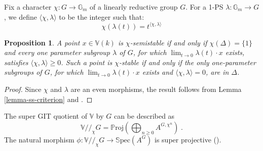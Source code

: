 \documentclass[12pt, reqno]{amsart}
\theoremstyle{plain}
\newtheorem{proposition}[theorem]{Proposition}
\numberwithin{equation}{section}
\def \ra{\rightarrow}
\newcommand{\Spec}[1]{\mathbb{S}\mathrm{pec}(#1)}
\newcommand{\Proj}[1]{\mathbb{P}\mathrm{roj}(#1)}
\begin{document}
Fix a character $ \chi: G \to \mathbb{G}_m $ of a linearly reductive group $G$. For a 1-PS $ \lambda : \mathbb{G}_m \to G $, we define $\langle \chi, \lambda \rangle$ to be the integer such that:
$$ \chi(\lambda(t)) = t^{\langle \chi, \lambda \rangle} $$

\begin{proposition}\label{prop-pairing}
A point $x \in \mathbb{V}(k)$ is $\chi$-semistable if and only if $\chi(\Delta)=\{1\}$ and every one parameter subgroup $\lambda$ of $G$, for which $\lim_{t \rightarrow 0} \lambda(t) \cdot x$ exists, satisfies $\langle \chi, \lambda \rangle \ge 0$. Such a point is $\chi$-stable if and only if the only one-parameter subgroups of $G$, for which $\lim_{t \rightarrow 0} \lambda(t) \cdot x$ exists and $\langle \chi, \lambda \rangle = 0$, are in $\Delta$.
\end{proposition}
\begin{proof}
Since $\chi$ and $\lambda$ are an even morphisms, the result follows from Lemma \ref{lemma-ss-criterion} and \cite[Proposition 2.5]{Ki94}.
\end{proof}

The super GIT quotient of $\mathbb{V}$ by $G$ can be described as 
$$
\mathbb{V} / \! \!/_{\! \!\chi} G = \Proj{\bigoplus_{n\geq 0} A^{G, \chi^n}}\;.
$$
The natural morphism $\phi \colon \mathbb{V} / \!\! /_{\! \!\chi} G \ra \Spec{A^G}$ is super projective (\cite[Definition 2.23]{BRP}). 
\end{document}
